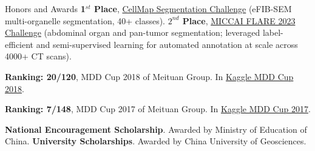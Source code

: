 \begin{rubric}{Honors and Awards}
\entry*[2026] \textbf{1$^{st}$ Place}, \href{https://cellmapchallenge.janelia.org/}{CellMap Segmentation Challenge} (eFIB-SEM multi-organelle segmentation, 40+ classes).
\entry*[2023] \textbf{$2^{nd}$ Place}, \href{https://codalab.lisn.upsaclay.fr/competitions/12239}{MICCAI FLARE 2023 Challenge} (abdominal organ and pan-tumor segmentation; leveraged label-efficient and semi-supervised learning for automated annotation at scale across 4000+ CT scans).


\entry*[2018] \textbf{Ranking: 20/120}, MDD Cup 2018 of Meituan Group. In \href{https://www.kaggle.com/competitions/mdd-cup-2018}{Kaggle MDD Cup 2018}.

\entry*[2017] \textbf{Ranking: 7/148}, MDD Cup 2017 of Meituan Group. In \href{https://www.kaggle.com/competitions/mdd-cup-2017}{Kaggle MDD Cup 2017}.

\entry*[2012] \textbf{National Encouragement Scholarship}. Awarded by Ministry of Education of China.
\entry*[2012, 2013, 2014] \textbf{University Scholarships}. Awarded by China University of Geosciences.

\end{rubric}
